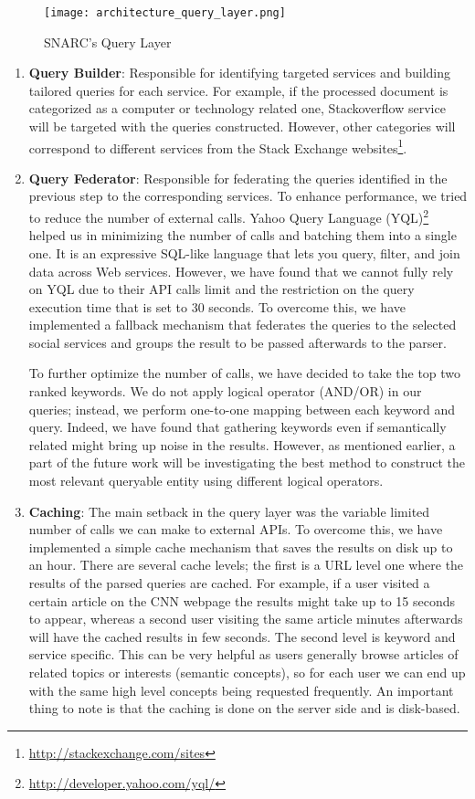 \begin{figure}[!ht]
  \centering
    \texttt{[image: architecture\_query\_layer.png]}
  \caption{SNARC's Query Layer}
  \label{fig:architecture_query_layer}
\end{figure}

\begin{enumerate}

  \item \textbf{Query Builder}: Responsible for identifying targeted services and building tailored queries for each service. For example, if the processed document is categorized as a computer or technology related one, Stackoverflow service will be targeted with the queries constructed. However, other categories will correspond to different services from the Stack Exchange websites\footnote{\url{http://stackexchange.com/sites}}.
  \item \textbf{Query Federator}: Responsible for federating the queries identified in the previous step to the corresponding services. To enhance performance, we tried to reduce the number of external calls. Yahoo Query Language (YQL)\footnote{\url{http://developer.yahoo.com/yql/}} helped us in minimizing the number of calls and batching them into a single one. It is an expressive SQL-like language that lets you query, filter, and join data across Web services. However, we have found that we cannot fully rely on YQL due to their API calls limit and the restriction on the query execution time that is set to 30 seconds. To overcome this, we have implemented a fallback mechanism that federates the queries to the selected social services and groups the result to be passed afterwards to the parser.

  To further optimize the number of calls, we have decided to take the top two ranked keywords. We do not apply logical operator (AND/OR) in our queries; instead, we perform one-to-one mapping between each keyword and query. Indeed, we have found that gathering keywords even if semantically related might bring up noise in the results. However, as mentioned earlier, a part of the future work will be investigating the best method to construct the most relevant queryable entity using different logical operators.

  \item \textbf{Caching}: The main setback in the query layer was the variable limited number of calls we can make to external APIs. To overcome this, we have implemented a simple cache mechanism that saves the results on disk up to an hour. There are several cache levels; the first is a URL level one where the results of the parsed queries are cached. For example, if a user visited a certain article on the CNN webpage the results might take up to 15 seconds to appear, whereas a second user visiting the same article minutes afterwards will have the cached results in few seconds. The second level is keyword and service specific. This can be very helpful as users generally browse articles of related topics or interests (semantic concepts), so for each user we can end up with the same high level concepts being requested frequently. An important thing to note is that the caching is done on the server side and is disk-based.


\end{enumerate}
